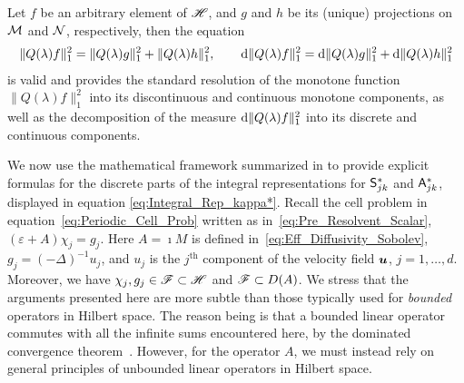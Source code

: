 \documentclass[amsa]{ipart}
\begin{document}
\begin{theorem}
Let $f$ be an arbitrary element of $\mathscr{H}$, and $g$ and $h$ be its (unique)
projections on $\mathcal{M}$ and $\mathcal{N}$, respectively, then the equation
%
\begin{align}\label{eq:Disc_Cont_Measures}
  \|Q(\lambda)f\|_1^2=\|Q(\lambda)g\|_1^2+\|Q(\lambda)h\|_1^2, \qquad
  \d\|Q(\lambda)f\|_1^2=\d\|Q(\lambda)g\|_1^2+\d\|Q(\lambda)h\|_1^2
\end{align}
%
is valid and provides the standard resolution of the monotone function
$\|Q(\lambda)f\|_1^2$ into its discontinuous and continuous monotone
components, as well as the decomposition of the measure
$\mathrm{d}\|Q(\lambda)f\|_1^2$ into its discrete and continuous components.  
\end{theorem}
%






We now use the mathematical framework summarized in
 to provide explicit formulas for the
discrete parts of the integral representations for $\mathsf{S}^*_{jk}$
and $\mathsf{A}^*_{jk}$, displayed in equation
\eqref{eq:Integral_Rep_kappa*}. Recall the cell problem
in equation~\eqref{eq:Periodic_Cell_Prob} written as
in~\eqref{eq:Pre_Resolvent_Scalar}, $(\varepsilon+A)\chi_j=g_j$. Here $A=\imath M$ 
is defined in~\eqref{eq:Eff_Diffusivity_Sobolev}, $g_j=(-\Delta)^{-1}u_j$,
and $u_j$ is the $j^{\text{th}}$ component of the velocity field
$\boldsymbol{u}$, $j=1,\ldots,d$. Moreover, we have $\chi_j,g_j\in\mathscr{F}\subset\mathscr{H}$ and $\mathscr{F}\subset
D(A)$. We stress that the arguments presented here are more subtle
than those typically used for \emph{bounded} operators in Hilbert
space. The reason being is that a bounded linear operator commutes with all
the infinite sums encountered here, by the dominated convergence
theorem~\cite{Folland:99:RealAnalysis}. However, for the operator $A$,
we must instead rely on general principles of unbounded linear operators in
Hilbert space.  
\end{document}
